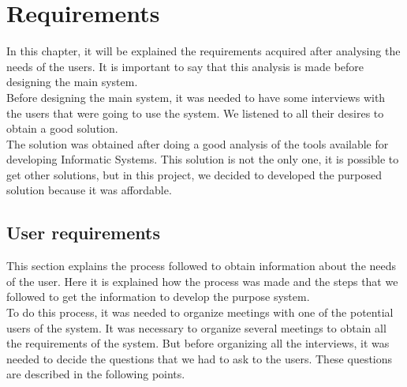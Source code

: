 
\chapter{Requirements}
\newpage

In this chapter, it will be explained the requirements acquired after analysing the needs of the users. It is important to say that this analysis is made before designing the main system.\\

Before designing the main system, it was needed to have some interviews with the users that were going to use the system. We listened to all their desires to obtain a good solution.\\

The solution was obtained after doing a good analysis of the tools available for developing Informatic Systems. This solution is not the only one, it is possible to get other solutions, but in this project, we decided to developed the purposed solution because it was affordable.

\section{User requirements}

This section explains the process followed to obtain information about the needs of the user. Here it is explained how the process was made and the steps that we followed to get the information to develop the purpose system.\\

To do this process, it was needed to organize meetings with one of the potential users of the system. It was necessary to organize several meetings to obtain all the requirements of the system. But before organizing all the interviews, it was needed to decide the questions that we had to ask to the users. These questions are described in the following points.

